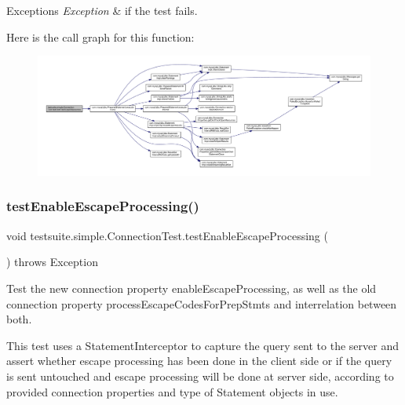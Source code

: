 \begin{DoxyExceptions}{Exceptions}
{\em Exception} & if the test fails. \\
\hline
\end{DoxyExceptions}
Here is the call graph for this function\+:
\nopagebreak
\begin{figure}[H]
\begin{center}
\leavevmode
\includegraphics[width=350pt]{classtestsuite_1_1simple_1_1_connection_test_a018eaff5a1cc1db390b843a77c50d63f_cgraph}
\end{center}
\end{figure}
\mbox{\label{classtestsuite_1_1simple_1_1_connection_test_a64fec8e4893bf266e66b4f59ceeb323f}} 
\subsubsection{\texorpdfstring{test\+Enable\+Escape\+Processing()}{testEnableEscapeProcessing()}}
{\footnotesize\ttfamily void testsuite.\+simple.\+Connection\+Test.\+test\+Enable\+Escape\+Processing (\begin{DoxyParamCaption}{ }\end{DoxyParamCaption}) throws Exception}

Test the new connection property \textquotesingle{}enable\+Escape\+Processing\textquotesingle{}, as well as the old connection property \textquotesingle{}process\+Escape\+Codes\+For\+Prep\+Stmts\textquotesingle{} and interrelation between both.

This test uses a Statement\+Interceptor to capture the query sent to the server and assert whether escape processing has been done in the client side or if the query is sent untouched and escape processing will be done at server side, according to provided connection properties and type of Statement objects in use. \mbox{\label{classtestsuite_1_1simple_1_1_connection_test_a6e0b85502950068c4a43a70f70f93a56}} 
